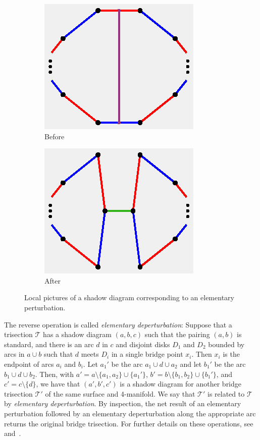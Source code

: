 \documentclass[11pt, oneside]{amsart}
\theoremstyle{theorem}
\theoremstyle{definition}
\newcommand{\T}{\mathcal{T}}
\theoremstyle{theorem}
\begin{document}
\begin{figure}[h!]
\begin{subfigure}{.5\textwidth}
  \centering
  \includegraphics[width=.5\linewidth]{perturb1.eps}
  \caption{Before}
  \label{per1}
\end{subfigure}%
\begin{subfigure}{.5\textwidth}
  \centering
  \includegraphics[width=.5\linewidth]{perturb2.eps}
  \caption{After}
  \label{per2}
\end{subfigure}
\caption{Local pictures of a shadow diagram corresponding to an elementary perturbation.}
\label{pert}
\end{figure}

The reverse operation is called \emph{elementary deperturbation}:  Suppose that a trisection $\T$ has a shadow diagram $(a,b,c)$ such that the pairing $(a,b)$ is standard, and there is an arc $d$ in $c$ and disjoint disks $D_1$ and $D_2$ bounded by arcs in $a \cup b$ such that $d$ meets $D_i$ in a single bridge point $x_i$.  Then $x_i$ is the endpoint of arcs $a_i$ and $b_i$.  Let $a_1'$ be the arc $a_1 \cup d \cup a_2$ and let $b_1'$ be the arc $b_1 \cup d \cup b_2$.  Then, with $a' = a \setminus \{a_1,a_2\} \cup \{a_1'\}$, $b' = b \setminus \{b_1,b_2\} \cup \{b_1'\}$, and $c' = c \setminus \{d\}$, we have that $(a',b',c')$ is a shadow diagram for another bridge trisection $\T'$ of the same surface and 4-manifold.  We say that $\T'$ is related to $\T$ by \emph{elementary deperturbation}.  By inspection, the net result of an elementary perturbation followed by an elementary deperturbation along the appropriate arc returns the original bridge trisection.  For further details on these operations, see~\cite{MZB1} and~\cite{MZB2}.
\end{document}
